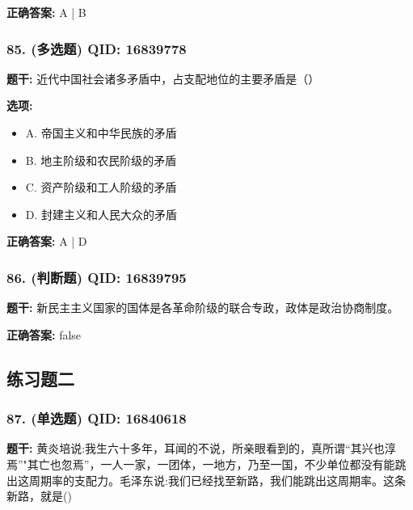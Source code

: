 \documentclass[12pt,UTF8]{ctexart}
\begin{document}
\textbf{正确答案:}
A | B

\vspace{0.3em}\hrulefill\vspace{0.7em}

\subsubsection*{85. (多选题) \small QID: 16839778}

\textbf{题干:}
近代中国社会诸多矛盾中，占支配地位的主要矛盾是（）

\textbf{选项:}
\begin{itemize}[leftmargin=*]

  \item A. 帝国主义和中华民族的矛盾

  \item B. 地主阶级和农民阶级的矛盾

  \item C. 资产阶级和工人阶级的矛盾

  \item D. 封建主义和人民大众的矛盾

\end{itemize}

\textbf{正确答案:}
A | D

\vspace{0.3em}\hrulefill\vspace{0.7em}

\subsubsection*{86. (判断题) \small QID: 16839795}

\textbf{题干:}
新民主主义国家的国体是各革命阶级的联合专政，政体是政治协商制度。

\textbf{正确答案:}
false

\vspace{0.3em}\hrulefill\vspace{0.7em}

\subsection*{练习题二}

\subsubsection*{87. (单选题) \small QID: 16840618}

\textbf{题干:}
黄炎培说:我生六十多年，耳闻的不说，所亲眼看到的，真所谓“其兴也淳焉”"其亡也忽焉”，一人一家，一团体，一地方，乃至一国，不少单位都没有能跳出这周期率的支配力。毛泽东说:我们已经找至新路，我们能跳出这周期率。这条新路，就是()
\end{document}

